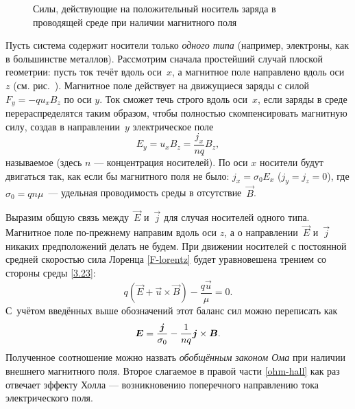 \begin{figure}[h!]
\centering
    \caption{Силы, действующие на положительный носитель заряда в проводящей среде
    при наличии магнитного поля}
\end{figure}

Пусть система содержит носители только \emph{одного типа}
(например, электроны, как в большинстве металлов).
Рассмотрим сначала простейший случай плоской геометрии:
пусть ток течёт вдоль оси~$x$, 
а магнитное поле направлено вдоль оси $z$ (см. рис.~).
Магнитное поле действует на движущиеся заряды с силой $F_y=-qu_xB_z$ по оси $y$.
Ток сможет течь строго вдоль оси~$x$, если заряды в среде перераспределятся 
таким образом, чтобы полностью скомпенсировать магнитную силу, 
создав в направлении~$y$ электрическое поле
\begin{equation*}
E_y=u_x B_z=\frac{j_x}{nq} B_z,
\end{equation*}
называемое  (здесь $n$ --- концентрация носителей).
По оси $x$ носители будут двигаться так, как если бы магнитного поля не было:
$j_x=\sigma_0 E_x$ ($j_y=j_z=0$), где $\sigma_0 = qn\mu$~---
удельная проводимость среды в отсутствие~$\vec{B}$.

Выразим общую связь между~$\vec{E}$ и~$\vec{j}$ для случая носителей одного типа.
Магнитное поле по-прежнему направим вдоль оси $z$, а о 
направлении~$\vec{E}$ и~$\vec{j}$ никаких предположений делать не будем.
При движении носителей с постоянной средней скоростью сила Лоренца
\eqref{F-lorentz} будет уравновешена трением со стороны среды \eqref{3.23}:
\begin{equation*}
    q(\vec{E}+\vec{u}\times \vec{B}) - \frac{q\vec{u}}{\mu} =0.
\end{equation*}
С~учётом введённых выше обозначений этот баланс сил можно переписать как
\begin{equation}
    \eqmark{ohm-hall}
    \vec{E} = \frac{\vec{j}}{\sigma_0} -
    \frac{1}{nq} \vec{j}\times\vec{B}.
\end{equation}
Полученное соотношение можно назвать \emph{обобщённым законом Ома} при
наличии внешнего магнитного поля. Второе слагаемое в правой части \eqref{ohm-hall}
как раз отвечает эффекту Холла --- возникновению поперечного 
направлению тока электрического поля.

